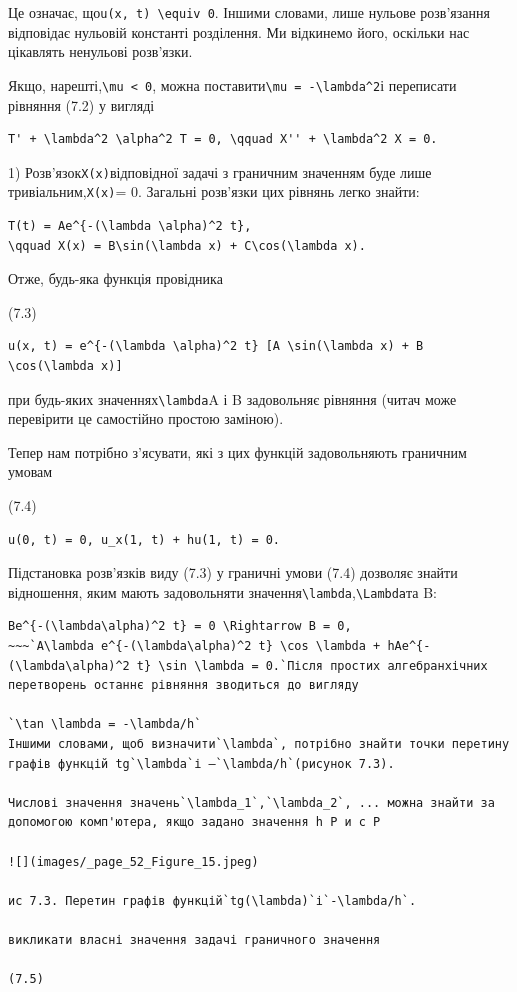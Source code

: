 \documentclass[
  ukrainian,
]{article}
\begin{document}
Це означає, що\texttt{u(x,\ t)\ \textbackslash{}equiv\ 0}. Іншими
словами, лише нульове розв'язання відповідає нульовій константі
розділення. Ми відкинемо його, оскільки нас цікавлять ненульові
розв'язки.

Якщо, нарешті,\texttt{\textbackslash{}mu\ \textless{}\ 0}, можна
поставити\texttt{\textbackslash{}mu\ =\ -\textbackslash{}lambda\^{}2}і
переписати рівняння (7.2) у вигляді

\begin{verbatim}
T' + \lambda^2 \alpha^2 T = 0, \qquad X'' + \lambda^2 X = 0.
\end{verbatim}

1) Розв'язок\texttt{X(x)}відповідної задачі з граничним значенням буде
лише тривіальним,\texttt{X(x)}= 0. Загальні розв'язки цих рівнянь легко
знайти:

\begin{verbatim}
T(t) = Ae^{-(\lambda \alpha)^2 t},
\qquad X(x) = B\sin(\lambda x) + C\cos(\lambda x).
\end{verbatim}

Отже, будь-яка функція провідника

(7.3)

\begin{verbatim}
u(x, t) = e^{-(\lambda \alpha)^2 t} [A \sin(\lambda x) + B \cos(\lambda x)]
\end{verbatim}

при будь-яких значеннях\texttt{\textbackslash{}lambda}A і B задовольняє
рівняння (читач може перевірити це самостійно простою заміною).

Тепер нам потрібно з'ясувати, які з цих функцій задовольняють граничним
умовам

(7.4)

\begin{verbatim}
u(0, t) = 0, u_x(1, t) + hu(1, t) = 0.
\end{verbatim}

Підстановка розв'язків виду (7.3) у граничні умови (7.4) дозволяє знайти
відношення, яким мають задовольняти
значення\texttt{\textbackslash{}lambda},\texttt{\textbackslash{}Lambda}та
B:

\begin{verbatim}
Be^{-(\lambda\alpha)^2 t} = 0 \Rightarrow B = 0,
~~~`A\lambda e^{-(\lambda\alpha)^2 t} \cos \lambda + hAe^{-(\lambda\alpha)^2 t} \sin \lambda = 0.`Після простих алгебранхічних перетворень останнє рівняння зводиться до вигляду

`\tan \lambda = -\lambda/h`
Іншими словами, щоб визначити`\lambda`, потрібно знайти точки перетину графів функцій tg`\lambda`і —`\lambda/h`(рисунок 7.3).

Числові значення значень`\lambda_1`,`\lambda_2`, ... можна знайти за допомогою комп'ютера, якщо задано значення h Р и с Р

![](images/_page_52_Figure_15.jpeg)

ис 7.3. Перетин графів функцій`tg(\lambda)`і`-\lambda/h`.

викликати власні значення задачі граничного значення

(7.5)
\end{verbatim}
\end{document}
